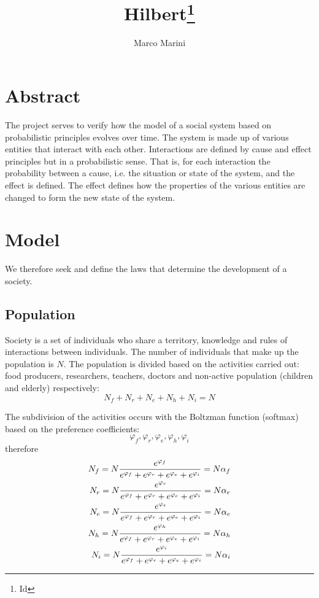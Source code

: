 \documentclass[a4paper,twoside]{article}
\begin{document}
\title{Hilbert\thanks{ $ $Id$ $}}
\author{Marco Marini}
\maketitle
\tableofcontents
\pagebreak

\section{Abstract}

The project serves to verify how the model of a social system based on probabilistic principles evolves over time.
The system is made up of various entities that interact with each other.
Interactions are defined by cause and effect principles but in a probabilistic sense.
That is, for each interaction the probability between a cause, i.e. the situation or state of the system, and the effect is defined.
The effect defines how the properties of the various entities are changed to form the new state of the system.

\section{Model}

We therefore seek and define the laws that determine the development of a society.

\subsection{Population}

Society is a set of individuals who share a territory, knowledge and rules of interactions between individuals.
The number of individuals that make up the population is $N$.
The population is divided based on the activities carried out: food producers, researchers, teachers, doctors and non-active population (children and elderly) respectively:
\begin{equation*}
	N_f + N_r + N_e + N_h + N_i = N
\end{equation*}

The subdivision of the activities occurs with the Boltzman function (softmax) based on the preference coefficients:
\begin{equation*}
	\varphi_f, \varphi_r, \varphi_e, \varphi_h, \varphi_i
\end{equation*}
therefore
\begin{eqnarray}{\label{eq:pop}}
	N_f = N \frac{e^{\varphi_f}}{e^{\varphi_f}+e^{\varphi_r}+e^{\varphi_e}+e^{\varphi_i}} = N \alpha_f
\\
	N_r = N \frac{e^{\varphi_r}}{e^{\varphi_f}+e^{\varphi_r}+e^{\varphi_e}+e^{\varphi_i}} = N \alpha_r
\\
	N_e = N \frac{e^{\varphi_e}}{e^{\varphi_f}+e^{\varphi_r}+e^{\varphi_e}+e^{\varphi_i}} = N \alpha_e
\\
	N_h = N \frac{e^{\varphi_h}}{e^{\varphi_f}+e^{\varphi_r}+e^{\varphi_e}+e^{\varphi_i}} = N \alpha_h
\\
	N_i = N \frac{e^{\varphi_i}}{e^{\varphi_f}+e^{\varphi_r}+e^{\varphi_e}+e^{\varphi_i}} = N \alpha_i
\end{eqnarray}
\end{document}

